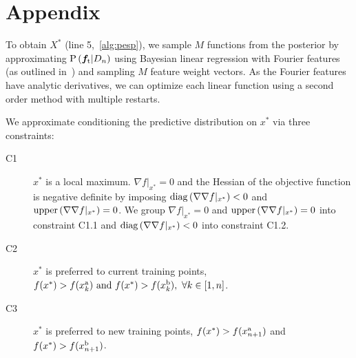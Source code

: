 \hypertarget{sec:appendix}{\section*{Appendix}}

To obtain $X^*$ (line 5,~\cref{alg:pesp}), we sample $M$ functions from the
posterior by approximating $\prob{\vecf{f}[\tn{t}]|D_n}$ using Bayesian linear
regression with Fourier features (as outlined in~\citep{hernandez2014predictive})
and sampling $M$ feature weight vectors. As the Fourier features have analytic
derivatives, we can optimize each linear function using a second order method
with multiple restarts.

We approximate conditioning the predictive distribution on $x^*$ via three
constraints: 
\begin{description} 
    \item[C1] $x^*$ is a local maximum. $\nabla f|_{x^*} = 0$ and the
    Hessian of the objective function is negative definite by imposing
    $\func{diag}{\nabla \nabla f|_{x^*}} < 0$ and $\func{upper}{\nabla
    \nabla f|_{x^*}} = 0$. We group $\nabla f|_{x^*} = 0$ and
    $\func{upper}{\nabla \nabla f|_{x^*}} = 0$ into constraint C1.1 and
    $\func{diag}{\nabla \nabla f|_{x^*}} < 0$ into constraint C1.2.

    \item[C2] $x^*$ is preferred to current training points, $f(x^*) >
    f(x_k^{\mathrm{a}}) \textrm{ and }  f(x^*) > f(x_k^{\mathrm{b}}), \ \forall k \in [1,
    n]$.

    \item[C3] $x^*$ is preferred to new training points, $f(x^*) >
    f(x_{n+1}^{\mathrm{a}})$ and $f(x^*) > f(x_{n+1}^{\mathrm{b}})$.  
\end{description}

